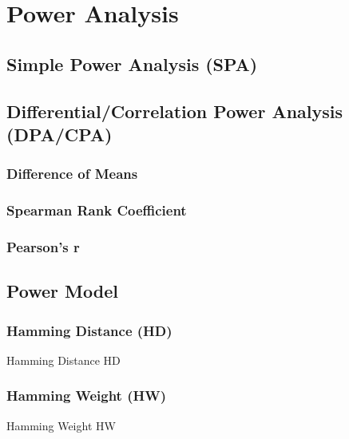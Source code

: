 \section{Power Analysis}
   \subsection{Simple Power Analysis (SPA)}
   \subsection{Differential/Correlation Power Analysis (DPA/CPA)}
       \subsubsection{Difference of Means}
        \subsubsection{Spearman Rank Coefficient}
        \subsubsection{Pearson's r}
      
   \subsection{Power Model}
     \subsubsection{Hamming Distance (HD)}
     Hamming Distance \Gls{HD}
      \subsubsection{Hamming Weight (HW)}
      Hamming Weight \Gls{HW}
